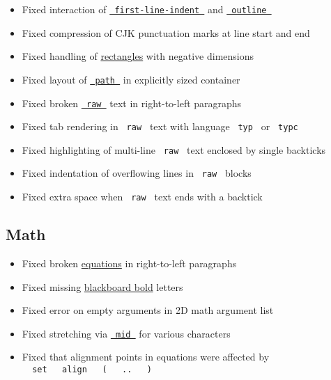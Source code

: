 \begin{itemize}
\tightlist
\item
  Fixed interaction of
  \href{/docs/reference/model/par/\#parameters-first-line-indent}{\texttt{\ first-line-indent\ }}
  and \href{/docs/reference/model/outline/}{\texttt{\ outline\ }}
\item
  Fixed compression of CJK punctuation marks at line start and end
\item
  Fixed handling of \href{/docs/reference/visualize/rect/}{rectangles}
  with negative dimensions
\item
  Fixed layout of
  \href{/docs/reference/visualize/path/}{\texttt{\ path\ }} in
  explicitly sized container
\item
  Fixed broken \href{/docs/reference/text/raw/}{\texttt{\ raw\ }} text
  in right-to-left paragraphs
\item
  Fixed tab rendering in \texttt{\ raw\ } text with language
  \texttt{\ typ\ } or \texttt{\ typc\ }
\item
  Fixed highlighting of multi-line \texttt{\ raw\ } text enclosed by
  single backticks
\item
  Fixed indentation of overflowing lines in \texttt{\ raw\ } blocks
\item
  Fixed extra space when \texttt{\ raw\ } text ends with a backtick
\end{itemize}

\subsection{Math}\label{math}

\begin{itemize}
\tightlist
\item
  Fixed broken \href{/docs/reference/math/equation/}{equations} in
  right-to-left paragraphs
\item
  Fixed missing
  \href{/docs/reference/math/variants/\#functions-bb}{blackboard bold}
  letters
\item
  Fixed error on empty arguments in 2D math argument list
\item
  Fixed stretching via
  \href{/docs/reference/math/lr/\#functions-mid}{\texttt{\ mid\ }} for
  various characters
\item
  Fixed that alignment points in equations were affected by
  \texttt{\ }{\texttt{\ set\ }}\texttt{\ }{\texttt{\ align\ }}\texttt{\ }{\texttt{\ (\ }}\texttt{\ }{\texttt{\ ..\ }}\texttt{\ }{\texttt{\ )\ }}\texttt{\ }
\end{itemize}

